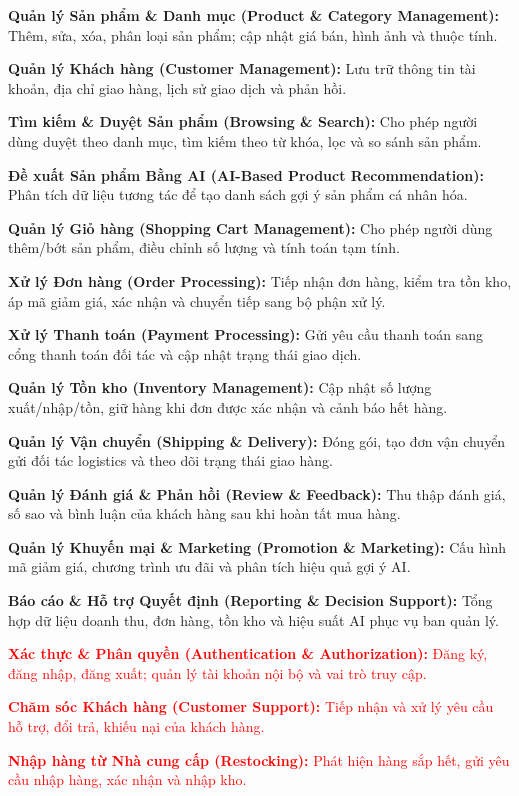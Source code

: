\documentclass[12pt,a4paper,oneside]{report}
\newif\ifmark \marktrue
\newcommand{\chg}[1]{\ifmark\textcolor{red}{#1}\else #1\fi}
\begin{document}
\begin{itemize}
  \item \textbf{Quản lý Sản phẩm \& Danh mục (Product \& Category Management):} Thêm, sửa, xóa, phân loại sản phẩm; cập nhật giá bán, hình ảnh và thuộc tính.
  \item \textbf{Quản lý Khách hàng (Customer Management):} Lưu trữ thông tin tài khoản, địa chỉ giao hàng, lịch sử giao dịch và phản hồi.
  \item \textbf{Tìm kiếm \& Duyệt Sản phẩm (Browsing \& Search):} Cho phép người dùng duyệt theo danh mục, tìm kiếm theo từ khóa, lọc và so sánh sản phẩm.
  \item \textbf{Đề xuất Sản phẩm Bằng AI (AI-Based Product Recommendation):} Phân tích dữ liệu tương tác để tạo danh sách gợi ý sản phẩm cá nhân hóa.
  \item \textbf{Quản lý Giỏ hàng (Shopping Cart Management):} Cho phép người dùng thêm/bớt sản phẩm, điều chỉnh số lượng và tính toán tạm tính.
  \item \textbf{Xử lý Đơn hàng (Order Processing):} Tiếp nhận đơn hàng, kiểm tra tồn kho, áp mã giảm giá, xác nhận và chuyển tiếp sang bộ phận xử lý.
  \item \textbf{Xử lý Thanh toán (Payment Processing):} Gửi yêu cầu thanh toán sang cổng thanh toán đối tác và cập nhật trạng thái giao dịch.
  \item \textbf{Quản lý Tồn kho (Inventory Management):} Cập nhật số lượng xuất/nhập/tồn, giữ hàng khi đơn được xác nhận và cảnh báo hết hàng.
  \item \textbf{Quản lý Vận chuyển (Shipping \& Delivery):} Đóng gói, tạo đơn vận chuyển gửi đối tác logistics và theo dõi trạng thái giao hàng.
  \item \textbf{Quản lý Đánh giá \& Phản hồi (Review \& Feedback):} Thu thập đánh giá, số sao và bình luận của khách hàng sau khi hoàn tất mua hàng.
  \item \textbf{Quản lý Khuyến mại \& Marketing (Promotion \& Marketing):} Cấu hình mã giảm giá, chương trình ưu đãi và phân tích hiệu quả gợi ý AI.
  \item \textbf{Báo cáo \& Hỗ trợ Quyết định (Reporting \& Decision Support):} Tổng hợp dữ liệu doanh thu, đơn hàng, tồn kho và hiệu suất AI phục vụ ban quản lý.
  \chg{\item \textbf{Xác thực \& Phân quyền (Authentication \& Authorization):} Đăng ký, đăng nhập, đăng xuất; quản lý tài khoản nội bộ và vai trò truy cập.}
  \chg{\item \textbf{Chăm sóc Khách hàng (Customer Support):} Tiếp nhận và xử lý yêu cầu hỗ trợ, đổi trả, khiếu nại của khách hàng.}
  \chg{\item \textbf{Nhập hàng từ Nhà cung cấp (Restocking):} Phát hiện hàng sắp hết, gửi yêu cầu nhập hàng, xác nhận và nhập kho.}
\end{itemize}
\end{document}
